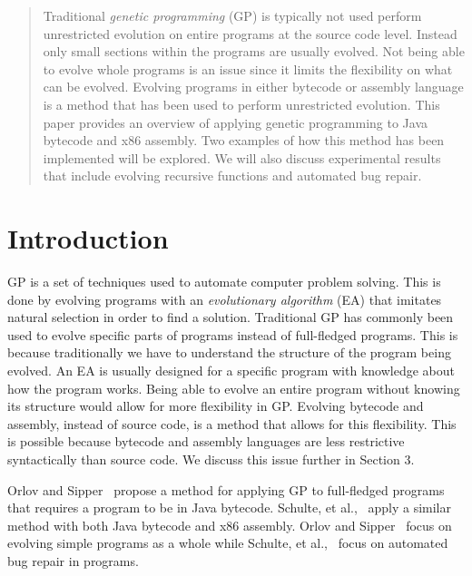 \documentclass{sig-alternate}
\begin{document}
\maketitle
\begin{abstract}
Traditional \textit{genetic programming} (GP) is typically not used perform unrestricted evolution on entire programs at the source code level. Instead only small sections within the programs are usually evolved. Not being able to evolve whole programs is an issue since it limits the flexibility on what can be evolved. Evolving programs in either bytecode or assembly language is a method that has been used to perform unrestricted evolution. This paper provides an overview of applying genetic programming to Java bytecode and x86 assembly. Two examples of how this method has been implemented will be explored. We will also discuss experimental results that include evolving recursive functions and automated bug repair.
\end{abstract}



\section{Introduction}
GP is a set of techniques used to automate computer problem solving. This is done by evolving programs with an \textit{evolutionary algorithm} (EA) that imitates natural selection in order to find a solution. Traditional GP has commonly been used to evolve specific parts of programs instead of full-fledged programs. This is because traditionally we have to understand the structure of the program being evolved. An EA is usually designed for a specific program with knowledge about how the program works. Being able to evolve an entire program without knowing its structure would allow for more flexibility in GP. Evolving bytecode and assembly, instead of source code, is a method that allows for this flexibility. This is possible because bytecode and assembly languages are less restrictive syntactically than source code. We discuss this issue further in Section 3.\par 

Orlov and Sipper~\cite{FINCH2:2009} propose a method for applying GP to full-fledged programs that requires a program to be in Java bytecode. Schulte, et al.,~\cite{Assembly:2010} apply a similar method with both Java bytecode and x86 assembly. Orlov and Sipper~\cite{FINCH:2011} focus on evolving simple programs as a whole while Schulte, et al.,~\cite{Assembly:2010} focus on automated bug repair in programs.\par
	
\end{document}
